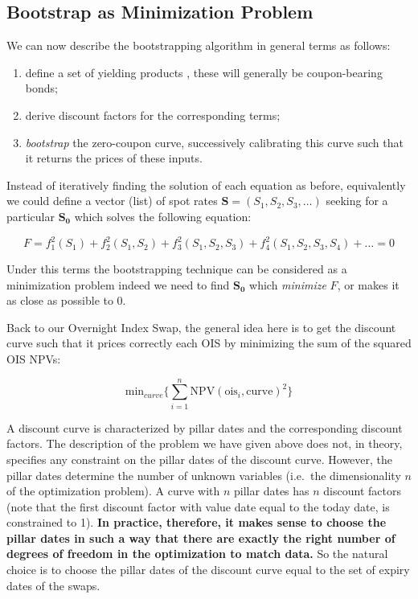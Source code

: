 \subsection{Bootstrap as Minimization Problem}
We can now describe the bootstrapping algorithm in general terms as follows:
\begin{enumerate}
\item define a set of yielding products , these will generally be coupon-bearing bonds;
\item derive discount factors for the corresponding terms;
\item \emph{bootstrap} the zero-coupon curve, successively calibrating this curve such that it returns the prices of these inputs.
\end{enumerate}

Instead of iteratively finding the solution of each equation as before, equivalently we could define a vector (list) of spot rates $\mathbf{S} = (S_1, S_2, S_3, \ldots)$ seeking for a particular $\mathbf{S_0}$ which solves the following equation:

\begin{equation*}
F = f_1^2(S_1) + f_2^2(S_1, S_2) + f_3^2(S_1, S_2, S_3) + f_4^2(S_1, S_2, S_3, S_4) + \ldots = 0
\end{equation*}

Under this terms the bootstrapping technique can be considered as a minimization problem indeed we need to find $\mathbf{S_0}$ which \emph{minimize} $F$, or makes it as close as possible to 0.

Back to our Overnight Index Swap, the general idea here is to get the discount curve such that it prices correctly each OIS by minimizing the sum of the squared OIS NPVs:

\[\mathrm{min}_{curve} \Big\{\sum_{i=1}^{n}\mathrm{NPV}(\mathrm{ois}_i, \mathrm{curve})^2\Big\}\]

A discount curve is characterized by pillar dates and the corresponding discount factors. The description of the problem we have given above does not, in theory, specifies any constraint on the pillar dates of the discount curve. However, the pillar dates determine the number of unknown variables (i.e.~the dimensionality \(n\) of the optimization problem). A curve with \(n\) pillar dates has \(n\) discount factors (note that the first discount factor with value date equal to the today date, is constrained to 1). \textbf{In practice, therefore, it makes sense to choose the pillar dates in such a way that there are exactly the right number of degrees of freedom in the optimization to match data.} So the natural choice is to choose the pillar dates of the discount curve equal to the set of expiry dates of the swaps.

